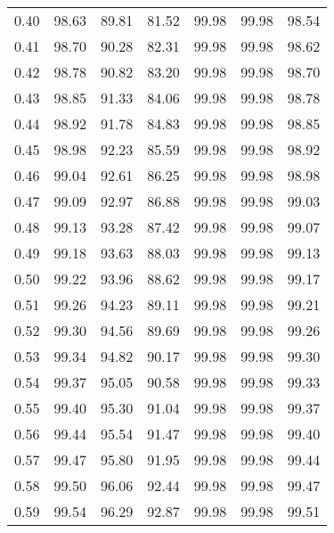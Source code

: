 \begin{tabular}{|c|c|c|c|c|c|c|}
      0.40 &     98.63 &     89.81 &      81.52 &   99.98 &      99.98 &         98.54 \\
      0.41 &     98.70 &     90.28 &      82.31 &   99.98 &      99.98 &         98.62 \\
      0.42 &     98.78 &     90.82 &      83.20 &   99.98 &      99.98 &         98.70 \\
      0.43 &     98.85 &     91.33 &      84.06 &   99.98 &      99.98 &         98.78 \\
      0.44 &     98.92 &     91.78 &      84.83 &   99.98 &      99.98 &         98.85 \\
      0.45 &     98.98 &     92.23 &      85.59 &   99.98 &      99.98 &         98.92 \\
      0.46 &     99.04 &     92.61 &      86.25 &   99.98 &      99.98 &         98.98 \\
      0.47 &     99.09 &     92.97 &      86.88 &   99.98 &      99.98 &         99.03 \\
      0.48 &     99.13 &     93.28 &      87.42 &   99.98 &      99.98 &         99.07 \\
      0.49 &     99.18 &     93.63 &      88.03 &   99.98 &      99.98 &         99.13 \\
      0.50 &     99.22 &     93.96 &      88.62 &   99.98 &      99.98 &         99.17 \\
      0.51 &     99.26 &     94.23 &      89.11 &   99.98 &      99.98 &         99.21 \\
      0.52 &     99.30 &     94.56 &      89.69 &   99.98 &      99.98 &         99.26 \\
      0.53 &     99.34 &     94.82 &      90.17 &   99.98 &      99.98 &         99.30 \\
      0.54 &     99.37 &     95.05 &      90.58 &   99.98 &      99.98 &         99.33 \\
      0.55 &     99.40 &     95.30 &      91.04 &   99.98 &      99.98 &         99.37 \\
      0.56 &     99.44 &     95.54 &      91.47 &   99.98 &      99.98 &         99.40 \\
      0.57 &     99.47 &     95.80 &      91.95 &   99.98 &      99.98 &         99.44 \\
      0.58 &     99.50 &     96.06 &      92.44 &   99.98 &      99.98 &         99.47 \\
      0.59 &     99.54 &     96.29 &      92.87 &   99.98 &      99.98 &         99.51 \\

\end{tabular}
